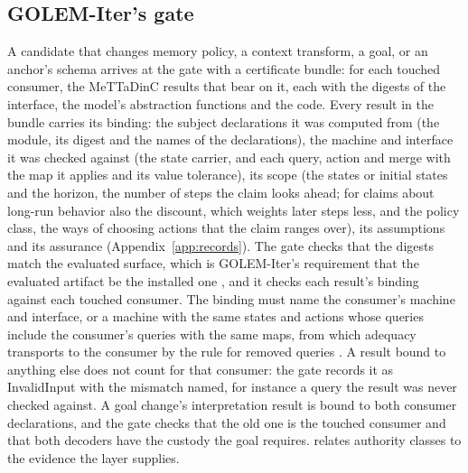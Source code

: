 \documentclass[11pt]{article}
\theoremstyle{definition}
\theoremstyle{plain}
\begin{document}
\subsection{GOLEM-Iter's gate}\label{sec:gate}

A candidate that changes memory policy, a context transform, a goal, or an anchor's schema arrives
at the gate with a certificate bundle: for each touched consumer, the MeTTaDinC results that bear on
it, each with the digests of the interface, the model's abstraction functions and the code. Every
result in the bundle carries its binding: the subject declarations it was computed from (the
module, its digest and the names of the declarations), the machine and interface it was checked
against (the state carrier, and each query, action and merge with the map it applies and its value
tolerance), its scope (the states or initial states and the horizon, the number of steps the
claim looks ahead; for claims about long-run behavior also the discount, which weights later steps
less, and the policy class, the ways of choosing actions that the claim ranges over), its
assumptions and its assurance (Appendix~\ref{app:records}). The gate
checks that the digests match the evaluated surface, which is GOLEM-Iter's requirement that the
evaluated artifact be the installed one \cite{golemspec}, and it checks each result's binding
against each touched consumer. The binding must name the consumer's machine and interface, or a
machine with the same states and actions whose queries include the consumer's queries with the
same maps, from which adequacy transports to the consumer by the rule for removed queries
\cite[Section~4.8]{spec}. A result bound to anything else does not count for that consumer: the
gate records it as InvalidInput with the mismatch named, for instance a query the result was never
checked against. A goal change's interpretation result is bound to both consumer declarations,
and the gate checks that the old one is the touched consumer and that both decoders have the
custody the goal requires.  relates authority classes to the evidence the layer
supplies.
\end{document}
